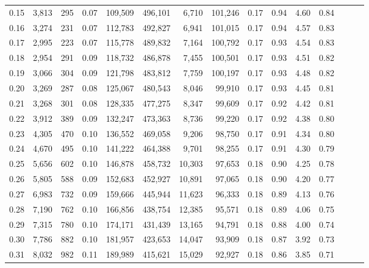 \begin{tabular}{rrrrrrrrrrrrrrr}
0.15 &   3,813 &    295 &  0.07 &  109,509 &  496,101 &    6,710 &  101,246 &  0.17 &  0.94 &  4.60 &      0.84 \\
0.16 &   3,274 &    231 &  0.07 &  112,783 &  492,827 &    6,941 &  101,015 &  0.17 &  0.94 &  4.57 &      0.83 \\
0.17 &   2,995 &    223 &  0.07 &  115,778 &  489,832 &    7,164 &  100,792 &  0.17 &  0.93 &  4.54 &      0.83 \\
0.18 &   2,954 &    291 &  0.09 &  118,732 &  486,878 &    7,455 &  100,501 &  0.17 &  0.93 &  4.51 &      0.82 \\
0.19 &   3,066 &    304 &  0.09 &  121,798 &  483,812 &    7,759 &  100,197 &  0.17 &  0.93 &  4.48 &      0.82 \\
0.20 &   3,269 &    287 &  0.08 &  125,067 &  480,543 &    8,046 &   99,910 &  0.17 &  0.93 &  4.45 &      0.81 \\
0.21 &   3,268 &    301 &  0.08 &  128,335 &  477,275 &    8,347 &   99,609 &  0.17 &  0.92 &  4.42 &      0.81 \\
0.22 &   3,912 &    389 &  0.09 &  132,247 &  473,363 &    8,736 &   99,220 &  0.17 &  0.92 &  4.38 &      0.80 \\
0.23 &   4,305 &    470 &  0.10 &  136,552 &  469,058 &    9,206 &   98,750 &  0.17 &  0.91 &  4.34 &      0.80 \\
0.24 &   4,670 &    495 &  0.10 &  141,222 &  464,388 &    9,701 &   98,255 &  0.17 &  0.91 &  4.30 &      0.79 \\
0.25 &   5,656 &    602 &  0.10 &  146,878 &  458,732 &   10,303 &   97,653 &  0.18 &  0.90 &  4.25 &      0.78 \\
0.26 &   5,805 &    588 &  0.09 &  152,683 &  452,927 &   10,891 &   97,065 &  0.18 &  0.90 &  4.20 &      0.77 \\
0.27 &   6,983 &    732 &  0.09 &  159,666 &  445,944 &   11,623 &   96,333 &  0.18 &  0.89 &  4.13 &      0.76 \\
0.28 &   7,190 &    762 &  0.10 &  166,856 &  438,754 &   12,385 &   95,571 &  0.18 &  0.89 &  4.06 &      0.75 \\
0.29 &   7,315 &    780 &  0.10 &  174,171 &  431,439 &   13,165 &   94,791 &  0.18 &  0.88 &  4.00 &      0.74 \\
0.30 &   7,786 &    882 &  0.10 &  181,957 &  423,653 &   14,047 &   93,909 &  0.18 &  0.87 &  3.92 &      0.73 \\
0.31 &   8,032 &    982 &  0.11 &  189,989 &  415,621 &   15,029 &   92,927 &  0.18 &  0.86 &  3.85 &      0.71 \\

\end{tabular}
